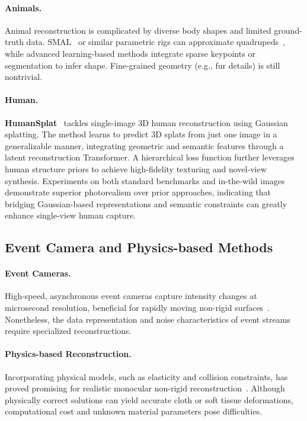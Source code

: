 \documentclass[11pt]{article}
\begin{document}
\paragraph{Animals.}
Animal reconstruction is complicated by diverse body shapes and limited ground-truth data. SMAL~\cite{zuffi20173d} or similar parametric rigs can approximate quadrupeds~\cite{zuffi2018lions}, while advanced learning-based methods integrate sparse keypoints or segmentation to infer shape. Fine-grained geometry (e.g., fur details) is still nontrivial.

\paragraph{Human.}
\textbf{HumanSplat}~\cite{pan2024humansplat} tackles single-image 3D human reconstruction using Gaussian splatting. The method learns to predict 3D splats from just one image in a generalizable manner, integrating geometric and semantic features through a latent reconstruction Transformer. A hierarchical loss function further leverages human structure priors to achieve high-fidelity texturing and novel-view synthesis. Experiments on both standard benchmarks and in-the-wild images demonstrate superior photorealism over prior approaches, indicating that bridging Gaussian-based representations and semantic constraints can greatly enhance single-view human capture.

\subsection{Event Camera and Physics-based Methods}
\label{subsec:event_physics}
\paragraph{Event Cameras.}
High-speed, asynchronous event cameras capture intensity changes at microsecond resolution, beneficial for rapidly moving non-rigid surfaces~\cite{xu2020eventcap, zou2021eventhpe}. Nonetheless, the data representation and noise characteristics of event streams require specialized reconstructions.

\paragraph{Physics-based Reconstruction.}
Incorporating physical models, such as elasticity and collision constraints, has proved promising for realistic monocular non-rigid reconstruction~\cite{malti2017elastic, ozgur2017particle, kairanda2022f}. Although physically correct solutions can yield accurate cloth or soft tissue deformations, computational cost and unknown material parameters pose difficulties.
\end{document}

